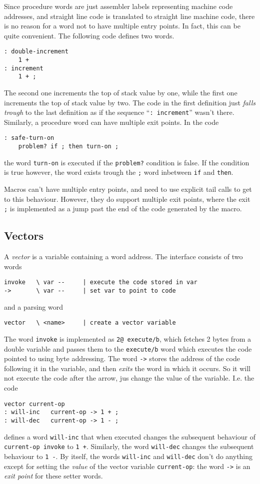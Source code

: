 \documentclass[12pt]{article}
\begin{document}
Since procedure words are just assembler labels representing machine
code addresses, and straight line code is translated to straight line
machine code, there is no reason for a word not to have multiple entry
points. In fact, this can be quite convenient. The following code
defines two words.
\begin{verbatim}
: double-increment
    1 +
: increment
    1 + ;
\end{verbatim}
The second one increments the top of stack value by one, while the
first one increments the top of stack value by two. The code in the
first definition just \emph{falls trough} to the last definition as if
the sequence ``\verb|: increment|'' wasn't there.  Similarly, a
procedure word can have multiple exit points. In the code
\begin{verbatim}
: safe-turn-on
    problem? if ; then turn-on ;
\end{verbatim}
the word \verb|turn-on| is executed if the \verb|problem?| condition
is false. If the condition is true however, the word exists trough the
\verb|;| word inbetween \verb|if| and \verb|then|.

Macros can't have multiple entry points, and need to use explicit tail
calls to get to this behaviour. However, they do support multiple exit
points, where the exit \verb|;| is implemented as a jump past the end
of the code generated by the macro.

\subsection{Vectors}

A \emph{vector} is a variable containing a word address. The interface
consists of two words
\begin{verbatim}
invoke   \ var --     | execute the code stored in var
->       \ var --     | set var to point to code
\end{verbatim}
and a parsing word
\begin{verbatim}
vector   \ <name>     | create a vector variable
\end{verbatim}
The word \verb|invoke| is implemented as \verb|2@ execute/b|, which
fetches 2 bytes from a double variable and passes them to the
\verb|execute/b| word which executes the code pointed to using byte
addressing.  The word \verb|->| stores the address of the code
following it in the variable, and then \emph{exits} the word in which
it occurs. So it will not execute the code after the arrow, jus change
the value of the variable. I.e. the code
\begin{verbatim}
vector current-op
: will-inc   current-op -> 1 + ;
: will-dec   current-op -> 1 - ;
\end{verbatim}
defines a word \verb|will-inc| that when executed changes the
subsequent behaviour of \verb|current-op invoke| to \verb|1 +|.
Similarly, the word \verb|will-dec| changes the subsequent behaviour
to \verb|1 -|. By itself, the words \verb|will-inc| and
\verb|will-dec| don't do anything except for setting the \emph{value}
of the vector variable \verb|current-op|: the word \verb|->| is an
\emph{exit point} for these setter words.
\end{document}
